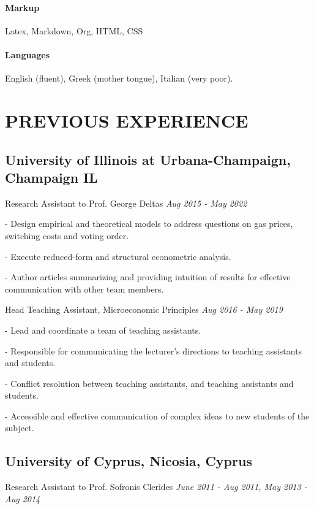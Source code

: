 \documentclass{article}
\begin{document}
\paragraph{Markup} Latex, Markdown, Org, HTML, CSS
\paragraph{Languages} English (fluent), Greek (mother tongue), Italian (very poor).

\section{PREVIOUS EXPERIENCE}
\subsection{\textbf{University of Illinois at Urbana-Champaign}, Champaign IL}
\noindent Research Assistant to Prof. George Deltas \hfill \emph{Aug 2015 - May 2022}

- Design empirical and theoretical models to address questions on gas prices, switching costs and voting order.

- Execute reduced-form and structural econometric analysis.

- Author articles summarizing and providing intuition of results for effective communication with other team members.

\vspace{.05cm}
\noindent Head Teaching Assistant, Microeconomic Principles \hfill \emph{Aug 2016 - May 2019}

- Lead and coordinate a team of teaching assistants.

- Responsible for communicating the lecturer's directions to teaching assistants and students.

- Conflict resolution between teaching assistants, and teaching assistants and students.

- Accessible and effective communication of complex ideas to new students of the subject.

\subsection{\textbf{University of Cyprus}, Nicosia, Cyprus}
\noindent Research Assistant to Prof. Sofronis Clerides \hfill \emph{June 2011 - Aug 2011, May 2013 - Aug 2014}
\end{document}
